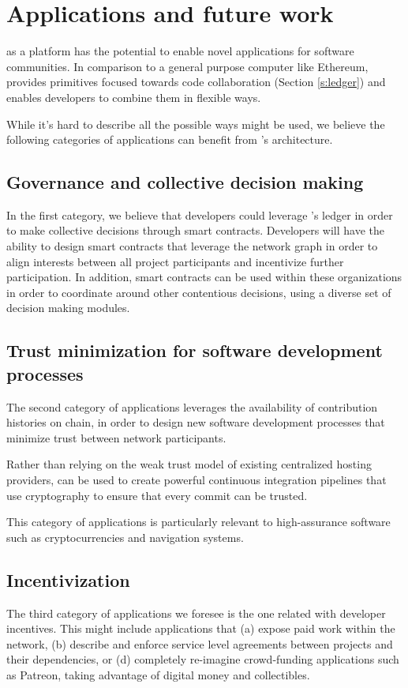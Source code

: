 
\section{Applications and future work}

\oscoin{} as a platform has the potential to enable novel applications for
software communities. In comparison to a general purpose computer like
Ethereum, \oscoin{} provides primitives focused towards code collaboration
(Section \ref{s:ledger}) and enables developers to combine them in flexible ways.

While it’s hard to describe all the possible ways \oscoin{} might be used, we
believe the following categories of applications can benefit from \oscoin{}’s
architecture.

\subsection{Governance and collective decision making}

In the first category, we believe that developers could leverage \oscoin{}’s
ledger in order to make collective decisions through smart contracts. Developers
will have the ability to design smart contracts that leverage the network graph in
order to align interests between all project participants and incentivize further
participation. In addition, smart contracts can be used within these organizations
in order to coordinate around other contentious decisions, using a diverse set of
decision making modules.

\subsection{Trust minimization for software development processes}
The second category of applications leverages the availability of contribution
histories on chain, in order to design new software development processes that
minimize trust between network participants.

Rather than relying on the weak trust model of existing centralized hosting
providers, \oscoin{} can be used to create powerful continuous integration
pipelines that use cryptography to ensure that every commit can be trusted.

This category of applications is particularly relevant to high-assurance
software such as cryptocurrencies and navigation systems.

\subsection{Incentivization}
The third category of applications we foresee is the one related with
developer incentives. This might include applications that (a) expose paid work
within the \oscoin{} network, (b) describe and enforce service level agreements
between projects and their dependencies, or (d) completely re-imagine crowd-funding
applications such as Patreon, taking advantage of digital money and collectibles.


